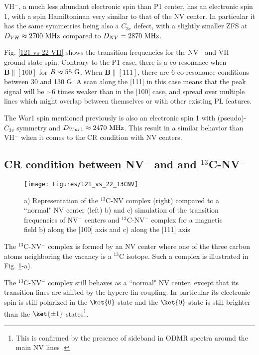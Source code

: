 \documentclass[a4paper,11pt]{report}
\begin{document}
VH$^-$, a much less abundant electronic spin than P1 center, has an electronic spin 1, with a spin Hamiltoninan very similar to that of the NV center. In particular it has the same symmetries being also a $C_{3v}$ defect, with a slightly smaller ZFS at $D_{VH} \approx 2700\ \rm MHz$ compared to $D_{NV}=2870\ \rm MHz$. 

Fig. \ref{121 vs 22 VH} shows the transition frequencies for the NV$^-$ and VH$^-$ ground state spin. Contrary to the P1 case, there is a co-resonance when $\mathbf{B} \parallel [100]$ for $B\approx 55\ \rm G$. When $\mathbf{B} \parallel [111]$, there are 6 co-resonance conditions between 30 and 130 G. A scan along the [111] in this case means that the peak signal will be $\sim 6$ times weaker than in the [100] case, and spread over multiple lines which might overlap between themselves or with other existing PL features.

The War1 spin mentioned previously is also an electronic spin 1 with (pseudo)-$C_{3v}$ symmetry and $D_{War1} \approx 2470\ \rm MHz$. This result in a similar behavior than VH$^-$ when it comes to the CR condition with NV centers.

\subsection{CR condition between NV$^-$ and and $^{13}$C-NV$^-$}

\begin{figure}[h]
\centering
\texttt{[image: Figures/121\_vs\_22\_13CNV]}
\caption{a) Representation of the $^{13}$C-NV complex (right) compared to a ``normal" NV center (left) b) and c) simulation of the transition frequencies of NV$^-$ centers and $^{13}$C-NV$^-$ complex for a magnetic field b) along the [100] axis and c) along the [111] axis}
\label{121 vs 22 13C-NV}
\end{figure}

The $^{13}$C-NV$^-$ complex is formed by an NV center where one of the three carbon atoms neighboring the vacancy is a $^{13}$C isotope. Such a complex is illustrated in Fig. \ref{121 vs 22 13C-NV}-a).

The $^{13}$C-NV$^-$ complex still behaves as a ``normal" NV center, except that its transition lines are shifted by the hypere-fin coupling. In particular its electronic spin is still polarized in the $\ket{0}$ state and the $\ket{0}$ state is still brighter than the $\ket{\pm 1}$ states\footnote{This is confirmed by the presence of sideband in ODMR spectra around the main NV lines \citep{simanovskaia2013sidebands}.}. 
\end{document}
